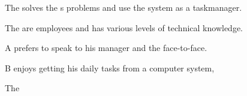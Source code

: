\begin{figure}[h]

\begin{sadlistar}{\Astaff}

 The \astaff{} solves the \aclient[]s problems and use the system as a taskmanager.  

 The \astaff[] are employees and has various levels of technical knowledge.

 \astaff[c] A prefers to speak to his manager and the \aclient[] face-to-face.

\astaff[c] B enjoys getting his daily tasks from a computer system, 
 \end{sadlistar}
 \caption{}
 \label{fig:actorstaff}
 \end{figure}


\begin{figure}[h]

\begin{sadlistar}{\Admin[]}

 The \Admin{} 



 \end{sadlistar}
 \caption{}
 \label{fig:actoradmin}
 \end{figure}